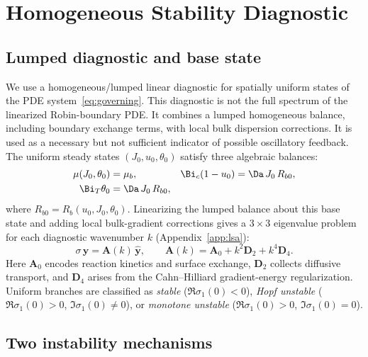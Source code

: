 \section{Homogeneous Stability Diagnostic}
\label{sec:lsa}

\subsection{Lumped diagnostic and base state}

We use a homogeneous/lumped linear diagnostic for spatially uniform
states of the PDE system~\eqref{eq:governing}.  This diagnostic is
not the full spectrum of the linearized Robin-boundary PDE. It
combines a lumped homogeneous balance, including boundary exchange
terms, with local bulk dispersion corrections. It is used as a
necessary but not sufficient indicator of possible oscillatory
feedback.  The uniform steady states $(J_0,u_0,\theta_0)$ satisfy
three algebraic balances:
\begin{align}
  \mu(J_0,\theta_0)&=\mu_b, &
  \Bi_c(1-u_0)&=\Da\,J_0\,R_{b0}, \nonumber\\
  \Bi_T\theta_0&=\Da\,J_0\,R_{b0},
  \label{eq:lsa_ss}
\end{align}
where $R_{b0}=R_b(u_0,J_0,\theta_0)$.  Linearizing the lumped
balance about this base state and adding local bulk-gradient
corrections gives a $3\times 3$ eigenvalue problem for each
diagnostic wavenumber $k$ (Appendix~\ref{app:lsa}):
\begin{equation}
  \sigma\,\widehat{\mathbf y} = \mathbf A(k)\,\widehat{\mathbf y},
  \qquad
  \mathbf A(k)=\mathbf A_0 + k^2\mathbf D_2 + k^4\mathbf D_4.
  \label{eq:dispersion_matrix}
\end{equation}
Here $\mathbf A_0$ encodes reaction kinetics and surface exchange,
$\mathbf D_2$ collects diffusive transport, and $\mathbf D_4$ arises
from the Cahn--Hilliard gradient-energy regularization.  Uniform
branches are classified as \emph{stable}
($\Re\sigma_1(0)<0$), \emph{Hopf unstable}
($\Re\sigma_1(0)>0$, $\Im\sigma_1(0)\neq 0$), or
\emph{monotone unstable} ($\Re\sigma_1(0)>0$,
$\Im\sigma_1(0)=0$).

\subsection{Two instability mechanisms}

